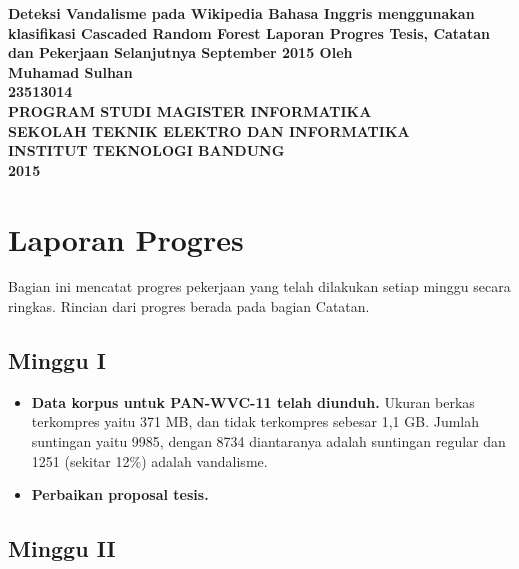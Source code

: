 \documentclass[12pt,a4paper,titlepage]{article}
\author{\myname}
\title{\mytitle}
\newcommand{\mytitle}{Deteksi Vandalisme pada Wikipedia Bahasa Inggris menggunakan klasifikasi Cascaded Random Forest}
\newcommand{\myname}{Muhamad Sulhan}
\newcommand{\mysid}{23513014}
\begin{document}
\thispagestyle{empty}
\begin{center}
	\textbf{%
		\mytitle
		\vfill
		Laporan Progres Tesis, Catatan dan Pekerjaan Selanjutnya
		\linebreak
		 September 2015
		\vfill
		Oleh \\
		\myname \\
		\mysid \\
		\vfill
		\uppercase{%
			Program Studi Magister Informatika \\
			Sekolah Teknik Elektro dan Informatika \\
			Institut Teknologi Bandung \\
			2015
		}
	}
\end{center}
\newpage

\section{Laporan Progres}

Bagian ini mencatat progres pekerjaan yang telah dilakukan setiap minggu secara ringkas.
Rincian dari progres berada pada bagian Catatan.

\subsection{Minggu I}

\begin{itemize}
	\item \textbf{Data korpus untuk PAN-WVC-11 telah diunduh.}
Ukuran berkas terkompres yaitu 371 MB, dan tidak terkompres sebesar 1,1 GB.
Jumlah suntingan yaitu 9985, dengan 8734 diantaranya adalah suntingan regular dan 1251 (sekitar 12\%) adalah vandalisme.

	\item \textbf{Perbaikan proposal tesis.}
\end{itemize}

\subsection{Minggu II}
\end{document}
